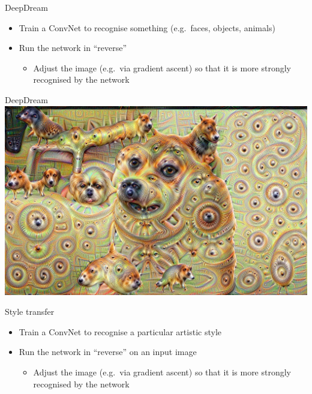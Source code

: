 \begin{frame}{DeepDream}
	\begin{itemize}
		\pause\item Train a ConvNet to recognise something (e.g.\ faces, objects, animals)
		\pause\item Run the network in ``reverse''
			\begin{itemize}
				\pause\item Adjust the image (e.g.\ via gradient ascent) so that it is more strongly recognised by the network
			\end{itemize}
	\end{itemize}
\end{frame}

\begin{frame}{DeepDream}
	\includegraphics[width=\textwidth]{deepdream}
\end{frame}

\begin{frame}{Style transfer}
	\begin{itemize}
		\pause\item Train a ConvNet to recognise a particular artistic style
		\pause\item Run the network in ``reverse'' on an input image
			\begin{itemize}
				\pause\item Adjust the image (e.g.\ via gradient ascent) so that it is more strongly recognised by the network
			\end{itemize}
	\end{itemize}
\end{frame}

